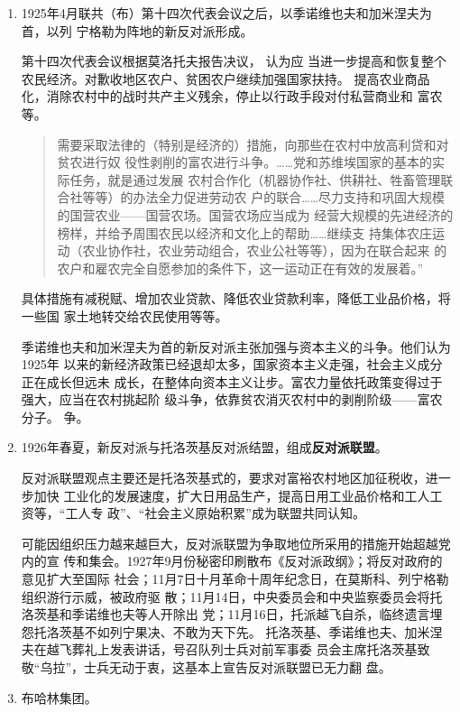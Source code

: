 \begin{enumerate}
\item 1925年4月联共（布）第十四次代表会议之后，以季诺维也夫和加米涅夫为首，以列
  宁格勒为阵地的新反对派形成。

  第十四次代表会议根据莫洛托夫报告决议， 认为应
  当进一步提高和恢复整个农民经济。对歉收地区农户、贫困农户继续加强国家扶持。
  提高农业商品化，消除农村中的战时共产主义残余，停止以行政手段对付私营商业和
  富农等。
  \begin{quotation}
    需要采取法律的（特别是经济的）措施，向那些在农村中放高利贷和对贫农进行奴
    役性剥削的富农进行斗争。……党和苏维埃国家的基本的实际任务，就是通过发展
    农村合作化（机器协作社、供耕社、牲畜管理联合社等等）的办法全力促进劳动农
    户的联合……尽力支持和巩固大规模的国营农业——国营农场。国营农场应当成为
    经营大规模的先进经济的榜样，并给予周围农民以经济和文化上的帮助……继续支
    持集体农庄运动（农业协作社，农业劳动组合，农业公社等等），因为在联合起来
    的农户和雇农完全自愿参加的条件下，这一运动正在有效的发展着。”
  \end{quotation}
  具体措施有减税赋、增加农业贷款、降低农业贷款利率，降低工业品价格，将一些国
  家土地转交给农民使用等等。

  季诺维也夫和加米涅夫为首的新反对派主张加强与资本主义的斗争。他们认为1925年
  以来的新经济政策已经退却太多，国家资本主义走强，社会主义成分正在成长但远未
  成长，在整体向资本主义让步。富农力量依托政策变得过于强大，应当在农村挑起阶
  级斗争，依靠贫农消灭农村中的剥削阶级——富农分子。
  争。

\item 1926年春夏，新反对派与托洛茨基反对派结盟，组成\textbf{反对派联盟}。

  反对派联盟观点主要还是托洛茨基式的，要求对富裕农村地区加征税收，进一步加快
  工业化的发展速度，扩大日用品生产，提高日用工业品价格和工人工资等，“工人专
  政”、“社会主义原始积累”成为联盟共同认知。

  可能因组织压力越来越巨大，反对派联盟为争取地位所采用的措施开始超越党内的宣
  传和集会。1927年9月份秘密印刷散布《反对派政纲》；将反对政府的意见扩大至国际
  社会；11月7日十月革命十周年纪念日，在莫斯科、列宁格勒组织游行示威，被政府驱
  散；11月14日，中央委员会和中央监察委员会将托洛茨基和季诺维也夫等人开除出
  党；11月16日，托派越飞自杀，临终遗言埋怨托洛茨基不如列宁果决、不敢为天下先。
  托洛茨基、季诺维也夫、加米涅夫在越飞葬礼上发表讲话，号召队列士兵对前军事委
  员会主席托洛茨基致敬“乌拉”，士兵无动于衷，这基本上宣告反对派联盟已无力翻
  盘。

\item 布哈林集团。


\end{enumerate}
